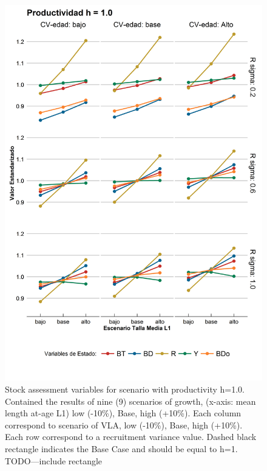 \documentclass[11pt,letterpaper,]{article}
\begin{document}
\begin{figure}[hbtp]
	\begin{center}
\includegraphics[width=0.70\columnwidth]{figures/steepness-10-estado.png}
  \end{center}
\caption{Stock assessment variables for scenario with productivity h=1.0. Contained the results of nine (9) scenarios of growth, (x-axis: mean length at-age L1) low (-10\%), Base, high (+10\%). Each column correspond to scenario of VLA, low (-10\%), Base, high (+10\%). Each row correspond to a recruitment variance value. Dashed black rectangle indicates the Base Case and should be equal to h=1. TODO---include rectangle}
\label{figure1}
\end{figure}
\end{document}
